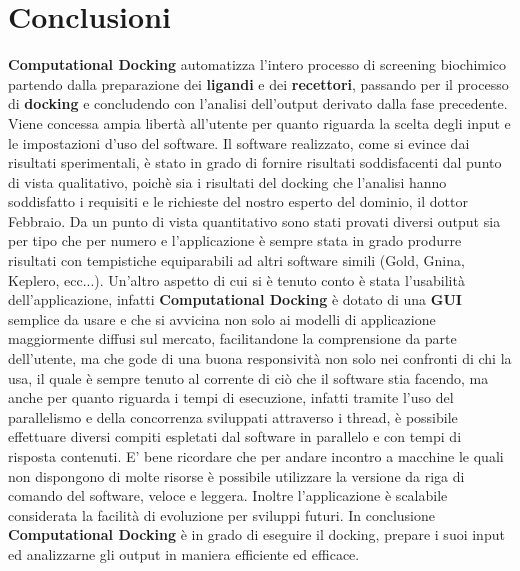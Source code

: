 \section{Conclusioni}
\textbf{Computational Docking} automatizza l'intero processo di screening biochimico partendo dalla preparazione dei \textbf{ligandi} e dei \textbf{recettori}, passando per il processo di \textbf{docking} e concludendo con l'analisi dell'output derivato dalla fase precedente. Viene concessa ampia libertà all'utente per quanto riguarda la scelta degli input e le impostazioni d'uso del software.
Il software realizzato, come si evince dai risultati sperimentali, è stato in grado di fornire risultati soddisfacenti dal punto di vista qualitativo, poichè sia i risultati del docking che l'analisi hanno soddisfatto i requisiti e le richieste del nostro esperto del dominio, il dottor Febbraio. Da un punto di vista quantitativo sono stati provati diversi output sia per tipo che per numero e l'applicazione è sempre stata in grado produrre risultati con tempistiche equiparabili ad altri software simili (Gold, Gnina, Keplero, ecc...). Un'altro aspetto di cui si è tenuto conto è stata l'usabilità dell'applicazione, infatti \textbf{Computational Docking} è dotato di una \textbf{GUI} semplice da usare e che si avvicina non solo ai modelli di applicazione maggiormente diffusi sul mercato, facilitandone la comprensione da parte dell'utente, ma che gode di una buona responsività non solo nei confronti di chi la usa, il quale è sempre tenuto al corrente di ciò che il software stia facendo, ma anche per quanto riguarda i tempi di esecuzione, infatti tramite l'uso del parallelismo e della concorrenza sviluppati attraverso i thread, è possibile effettuare diversi compiti espletati dal software in parallelo e con tempi di risposta contenuti. E' bene ricordare che per andare incontro a macchine le quali non dispongono di molte risorse è possibile utilizzare la versione da riga di comando del software, veloce e leggera.\newline
Inoltre l'applicazione è scalabile considerata la facilità di evoluzione per sviluppi futuri.
In conclusione \textbf{Computational Docking} è in grado di eseguire il docking, prepare i suoi input ed analizzarne gli output in maniera efficiente ed efficace.

